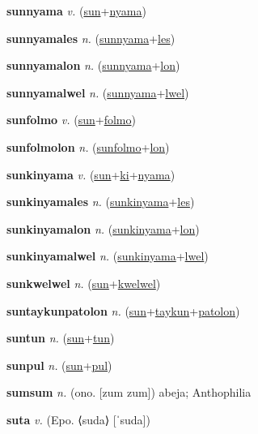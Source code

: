 \textbf{\hypertarget{sunnyama}{sunnyama}} \textit{v.} (\hyperlink{sun}{sun}+\allowbreak \hyperlink{nyama}{nyama})


\textbf{\hypertarget{sunnyamales}{sunnyamales}} \textit{n.} (\hyperlink{sunnyama}{sunnyama}+\allowbreak \hyperlink{les}{les})


\textbf{\hypertarget{sunnyamalon}{sunnyamalon}} \textit{n.} (\hyperlink{sunnyama}{sunnyama}+\allowbreak \hyperlink{lon}{lon})


\textbf{\hypertarget{sunnyamalwel}{sunnyamalwel}} \textit{n.} (\hyperlink{sunnyama}{sunnyama}+\allowbreak \hyperlink{lwel}{lwel})


\textbf{\hypertarget{sunfolmo}{sunfolmo}} \textit{v.} (\hyperlink{sun}{sun}+\allowbreak \hyperlink{folmo}{folmo})


\textbf{\hypertarget{sunfolmolon}{sunfolmolon}} \textit{n.} (\hyperlink{sunfolmo}{sunfolmo}+\allowbreak \hyperlink{lon}{lon})


\textbf{\hypertarget{sunkinyama}{sunkinyama}} \textit{v.} (\hyperlink{sun}{sun}+\allowbreak \hyperlink{ki}{ki}+\allowbreak \hyperlink{nyama}{nyama})


\textbf{\hypertarget{sunkinyamales}{sunkinyamales}} \textit{n.} (\hyperlink{sunkinyama}{sunkinyama}+\allowbreak \hyperlink{les}{les})


\textbf{\hypertarget{sunkinyamalon}{sunkinyamalon}} \textit{n.} (\hyperlink{sunkinyama}{sunkinyama}+\allowbreak \hyperlink{lon}{lon})


\textbf{\hypertarget{sunkinyamalwel}{sunkinyamalwel}} \textit{n.} (\hyperlink{sunkinyama}{sunkinyama}+\allowbreak \hyperlink{lwel}{lwel})


\textbf{\hypertarget{sunkwelwel}{sunkwelwel}} \textit{n.} (\hyperlink{sun}{sun}+\allowbreak \hyperlink{kwelwel}{kwelwel})


\textbf{\hypertarget{suntaykunpatolon}{suntaykunpatolon}} \textit{n.} (\hyperlink{sun}{sun}+\allowbreak \hyperlink{taykun}{taykun}+\allowbreak \hyperlink{patolon}{patolon})


\textbf{\hypertarget{suntun}{suntun}} \textit{n.} (\hyperlink{sun}{sun}+\allowbreak \hyperlink{tun}{tun})


\textbf{\hypertarget{sunpul}{sunpul}} \textit{n.} (\hyperlink{sun}{sun}+\allowbreak \hyperlink{pul}{pul})


\textbf{\hypertarget{sumsum}{sumsum}} \textit{n.} (ono. [zum zum])
abeja; Anthophilia

\textbf{\hypertarget{suta}{suta}} \textit{v.} (Epo. ⟨suda⟩ [ˈsuda])


